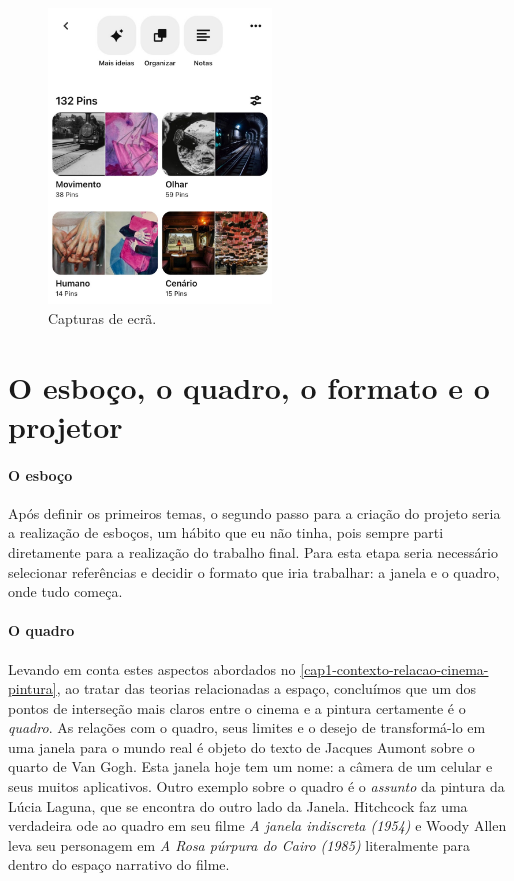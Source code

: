 \begin{figure}
	\caption{Capturas de ecrã. }

	\includegraphics[width=2.33526in,height=3.08547in]{figuras/captura-ecra.pdf.compressed.pdf}
\end{figure}

\section{O esboço, o quadro, o formato e o projetor}%
\label{o-esbouxe7o-o-quadro-o-formato-e-o-projetor}

\paragraph{O esboço} Após definir os primeiros temas, o segundo passo para a criação do
projeto seria a realização de esboços, um hábito que eu não tinha, pois
sempre parti diretamente para a realização do trabalho final. Para esta
etapa seria necessário selecionar referências e decidir o formato que
iria trabalhar: a janela e o quadro, onde tudo começa.

\paragraph{O quadro} Levando em conta estes aspectos abordados no \cref{cap1-contexto-relacao-cinema-pintura}, ao tratar das
teorias relacionadas a espaço, concluímos que um dos pontos de
interseção mais claros entre o cinema e a pintura certamente é o
\emph{quadro}. As relações com o quadro, seus limites e o desejo de
transformá-lo em uma janela para o mundo real é objeto do texto de
Jacques Aumont sobre o quarto de Van Gogh. Esta janela hoje tem um
nome: a câmera de um celular e seus muitos aplicativos. Outro exemplo
sobre o quadro é o \emph{assunto} da pintura da Lúcia Laguna, que se
encontra do outro lado da Janela. Hitchcock faz uma verdadeira ode ao
quadro em seu filme \emph{A janela indiscreta (1954)} e Woody Allen
leva seu personagem em \emph{A Rosa púrpura do Cairo (1985)}
literalmente para dentro do espaço narrativo do filme.

